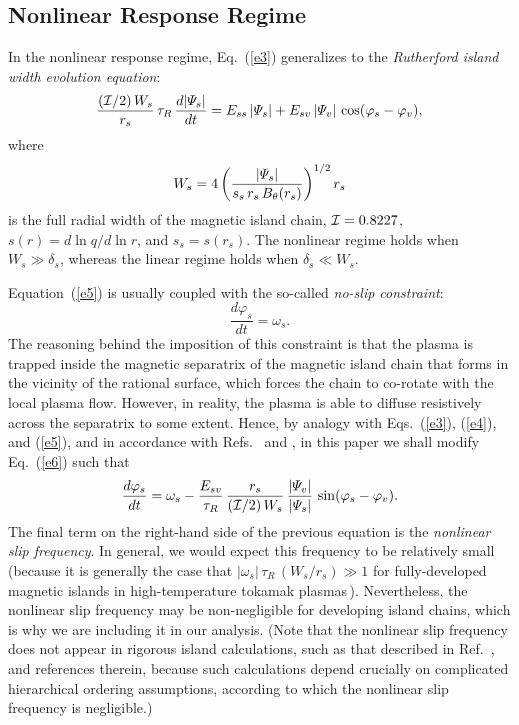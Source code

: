 \documentclass[12pt,prb,aps]{revtex4-1}
\begin{document}
\subsection{Nonlinear Response Regime}
In the nonlinear response regime, Eq.~(\ref{e3}) generalizes to the {\em Rutherford island width evolution equation}:\,\cite{ruth,ruth1}
\begin{equation}\label{e5}
\frac{({\cal I}/2)\,W_s}{r_s}\,\tau_R\,\frac{d|{\mit\Psi}_s|}{dt} = E_{ss}\,|{\mit\Psi}_s| + E_{sv}\,|{\mit\Psi}_v|\,\cos(\varphi_s-\varphi_v),
\end{equation}
where
\begin{equation}
W_s = 4\left(\frac{|{\mit\Psi}_s|}{s_s\,r_s\,B_\theta(r_s)}\right)^{1/2} r_s
\end{equation}
is the full radial width of the magnetic island chain, ${\cal I} = 0.8227$, $s(r) = d\ln q/d\ln r$, and $s_s=s(r_s)$. The
nonlinear regime holds when $W_s\gg \delta_s$, whereas the linear regime holds when $\delta_s\ll W_s$. 

Equation~(\ref{e5}) is usually coupled with the so-called {\em no-slip constraint}:\,\cite{rfa}
\begin{equation}\label{e6}
\frac{d\varphi_s}{dt} = \omega_s.
\end{equation}
The reasoning behind the imposition of this constraint is that the plasma is trapped inside the
magnetic separatrix of the magnetic island chain that forms in the vicinity of the rational surface,
which forces the chain to co-rotate with the local plasma flow. However, in reality, the plasma
is able to diffuse resistively across the separatrix to some extent. Hence, by analogy with Eqs.~(\ref{e3}), (\ref{e4}), and (\ref{e5}), and 
in accordance with Refs.~ and , in this paper we shall modify Eq.~(\ref{e6}) such that
\begin{equation}\label{e7}
\frac{d\varphi_s}{dt} = \omega_s - \frac{E_{sv}}{\tau_R}\,\frac{r_s}{({\cal I}/2)\,W_s}\,\frac{|{\mit\Psi}_v|}{|{\mit\Psi}_s|}\,\sin(\varphi_s-\varphi_v).
\end{equation}
The final term on the right-hand side of the previous equation is the {\em nonlinear slip frequency}. In general,
we would expect this frequency to be relatively small (because it is generally the case that $|\omega_s|\,\tau_R\,(W_s/r_s)\gg 1$
for fully-developed magnetic islands in high-temperature tokamak plasmas\,\cite{rf1,slip2}). Nevertheless, the
nonlinear slip frequency may be non-negligible for developing island chains, which is why we are including it in our analysis.
(Note that the nonlinear slip frequency does not appear in rigorous island calculations, such as
that described in Ref.~, and references therein, because such calculations depend crucially on
complicated hierarchical ordering assumptions, according to which the nonlinear slip frequency is negligible.)
\end{document}
